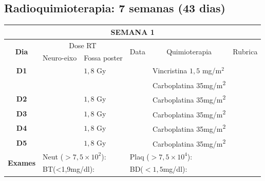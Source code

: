 \documentclass[11pt,a4paper,oldfontcommands]{memoir}
\begin{document}
\subsection{Radioquimioterapia: 7 semanas (43 dias)}

\begin{center}
\begin{table}[H]
\begin{tabular}{p{1cm}p{2cm}|p{2cm}|p{1cm}|p{4cm}|p{3cm}}
	\hline
	\multicolumn{6}{c}{\textbf{SEMANA 1}}\\
\hline
    \multicolumn{1}{c|}{\multirow{2}{*}{\textbf{Dia}}}&\multicolumn{2}{c|}{Dose RT}&\multicolumn{1}{c|}{\multirow{2}{*}{Data}}&\multicolumn{1}{c|}{\multirow{2}{*}{Quimioterapia}}&\multicolumn{1}{c}{\multirow{2}{*}{Rubrica}} \\
    \cline{2-3}
    \multicolumn{1}{c|}{\multirow{1}{*}{}}&{Neuro-eixo}&{Fossa poster}&& \\
	\hline
	\multicolumn{1}{c|}{\multirow{1}{*}{\textbf{D1}}}&\multicolumn{1}{c|}{}&{\(1,8\) Gy}&&{Vincristina \(1,5\) mg/m\(^2\)}&\\
	\multicolumn{1}{c|}{\multirow{1}{*}{\textbf{}}}&\multicolumn{1}{c|}{}&&&{Carboplatina 35mg/m\textsuperscript{2}}&\\
    \multicolumn{1}{c|}{\multirow{1}{*}{\textbf{D2}}}&\multicolumn{1}{c|}{}&{\(1,8\) Gy}&&{Carboplatina 35mg/m\textsuperscript{2}}&\\
    \multicolumn{1}{c|}{\multirow{1}{*}{\textbf{D3}}}&\multicolumn{1}{c|}{}&{\(1,8\) Gy}&&{Carboplatina 35mg/m\textsuperscript{2}}&\\
    \multicolumn{1}{c|}{\multirow{1}{*}{\textbf{D4}}}&\multicolumn{1}{c|}{}&{\(1,8\) Gy}&&{Carboplatina 35mg/m\textsuperscript{2}}&\\
    \multicolumn{1}{c|}{\multirow{1}{*}{\textbf{D5}}}&\multicolumn{1}{c|}{}&{\(1,8\) Gy}&&{Carboplatina 35mg/m\textsuperscript{2}}&\\
    \hline
    \multicolumn{1}{c|}{\multirow{2}{*}{\textbf{Exames}}}&\multicolumn{2}{l|}{Neut (\(>7,5\times10^2\)):}&\multicolumn{2}{l|}{Plaq (\(>7,5\times10^4\)):}&\\
    \cline{2-6}
    \multicolumn{1}{c|}{\multirow{2}{*}{{}}}&\multicolumn{2}{l|}{BT(<1,9mg/dl):}&\multicolumn{2}{l|}{BD(\(<1,5\)mg/dl):}&\\
    \hline
\end{tabular}
\end{table}
\begin{table}[H]
\begin{tabular}{p{1cm}p{2cm}|p{2cm}|p{1cm}|p{4cm}|p{3cm}}

\end{tabular}
\end{table}
\end{center}
\end{document}
